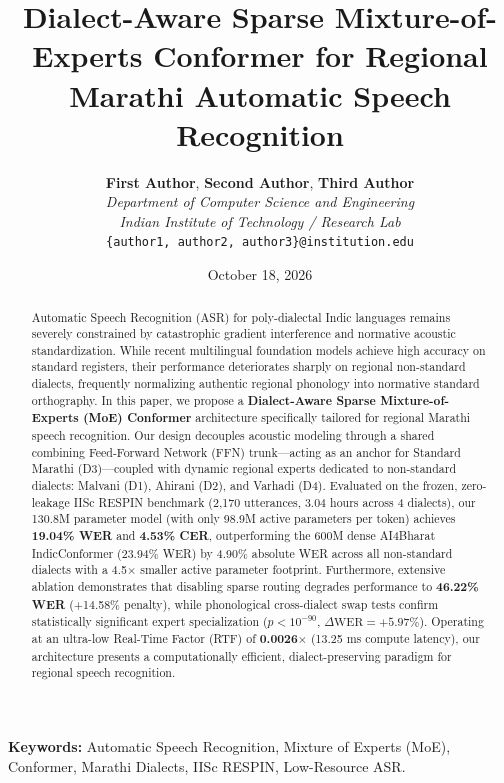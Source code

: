 \documentclass{article}
\title{\textbf{Dialect-Aware Sparse Mixture-of-Experts Conformer for Regional Marathi Automatic Speech Recognition}}
\author{
  \textbf{First Author}, \textbf{Second Author}, \textbf{Third Author} \\
  \textit{Department of Computer Science and Engineering} \\
  \textit{Indian Institute of Technology / Research Lab} \\
  \texttt{\{author1, author2, author3\}@institution.edu}
}
\date{October 18, 2026}
\begin{document}
\maketitle

\begin{abstract}
Automatic Speech Recognition (ASR) for poly-dialectal Indic languages remains severely constrained by catastrophic gradient interference and normative acoustic standardization. While recent multilingual foundation models achieve high accuracy on standard registers, their performance deteriorates sharply on regional non-standard dialects, frequently normalizing authentic regional phonology into normative standard orthography. In this paper, we propose a \textbf{Dialect-Aware Sparse Mixture-of-Experts (MoE) Conformer} architecture specifically tailored for regional Marathi speech recognition. Our design decouples acoustic modeling through a shared combining Feed-Forward Network (FFN) trunk—acting as an anchor for Standard Marathi (D3)—coupled with dynamic regional experts dedicated to non-standard dialects: Malvani (D1), Ahirani (D2), and Varhadi (D4). Evaluated on the frozen, zero-leakage IISc RESPIN benchmark (2,170 utterances, 3.04 hours across 4 dialects), our 130.8M parameter model (with only 98.9M active parameters per token) achieves \textbf{19.04\% WER} and \textbf{4.53\% CER}, outperforming the 600M dense AI4Bharat IndicConformer (23.94\% WER) by 4.90\% absolute WER across all non-standard dialects with a 4.5$\times$ smaller active parameter footprint. Furthermore, extensive ablation demonstrates that disabling sparse routing degrades performance to \textbf{46.22\% WER} (+14.58\% penalty), while phonological cross-dialect swap tests confirm statistically significant expert specialization ($p < 10^{-90}$, $\Delta\text{WER} = +5.97\%$). Operating at an ultra-low Real-Time Factor (RTF) of \textbf{0.0026$\times$} (13.25 ms compute latency), our architecture presents a computationally efficient, dialect-preserving paradigm for regional speech recognition.
\end{abstract}

\noindent\textbf{Keywords:} Automatic Speech Recognition, Mixture of Experts (MoE), Conformer, Marathi Dialects, IISc RESPIN, Low-Resource ASR.
\end{document}
